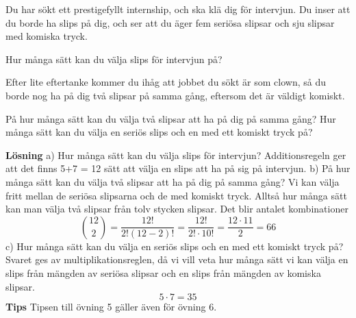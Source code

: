 \documentclass{tufte-handout}
\begin{document}
\begin{xca}
	Du har sökt ett prestigefyllt internship, och ska klä dig för intervjun. Du inser att du borde ha slips på dig, och ser att du äger fem seriösa slipsar och sju slipsar med komiska tryck.
  
	Hur många sätt kan du välja slips för intervjun på?
  
	Efter lite eftertanke kommer du ihåg att jobbet du sökt är som clown, så du borde nog ha på dig två slipsar på samma gång, eftersom det är väldigt komiskt.

	På hur många sätt kan du välja två slipsar att ha på dig på samma gång? Hur många sätt kan du välja en seriös slips och en med ett komiskt tryck på?
  \end{xca}
  
  \noindent\textbf{Lösning}
    \newline a) Hur många sätt kan du välja slips för intervjun?
    \newline Additionsregeln ger att det finns 5+7 = 12 sätt att välja en slips att ha på sig på intervjun.
    \newline b) På hur många sätt kan du välja två slipsar att ha på dig på samma gång?
    Vi kan välja fritt mellan de seriösa slipsarna och de med komiskt tryck.
    Alltså hur många sätt kan man välja två slipsar från tolv stycken slipsar.
    Det blir antalet kombinationer $$\binom{12}{2} = \frac{12!}{2!(12-2)!} = \frac{12!}{2!\cdot 10!} = \frac{12\cdot 11}{2} = 66$$
    \newline c) Hur många sätt kan du välja en seriös slips och en med ett komiskt tryck på?
    \newline Svaret ges av multiplikationsreglen, då vi vill veta hur många sätt vi kan välja en slips från mängden av seriösa slipsar och en slips från mängden av komiska slipsar.
    $$5\cdot 7 = 35$$
    \noindent\textbf{Tips}
    \newline Tipsen till övning 5 gäller även för övning 6.  



\end{document}
